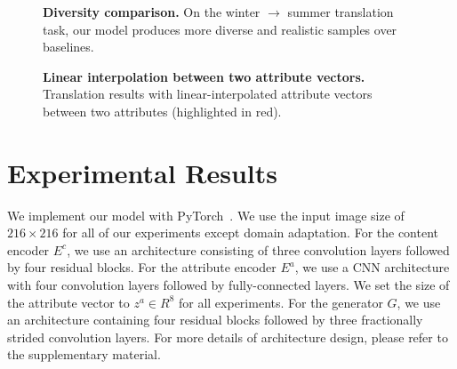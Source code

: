\documentclass[runningheads]{llncs}
\begin{document}
\begin{figure}[t]
	\caption{\textbf{Diversity comparison.} On the winter $\rightarrow$ summer translation task, our model produces more diverse and realistic samples over baselines.
	}
	\label{figure:diversity}
    \vspace{-4mm}
\end{figure}
\begin{figure}[t]
	\centering
	\caption{\textbf{Linear interpolation between two attribute vectors.}  Translation results with linear-interpolated attribute vectors between two attributes (highlighted in red).
	}
	\label{figure:interpolation}
    \vspace{\figmargin}
\end{figure}
\vspace{\secmargin}
\section{Experimental Results}
\label{sec:experiments}
\vspace{\secmargin}
\vspace{-1mm}
%
We implement our model with PyTorch~\cite{paszke2017pytorch}.
%
We use the input image size of $216 \times 216$ for all of our experiments except domain adaptation.
%
For the content encoder $E^c$, we use an architecture consisting of three convolution layers followed by four residual blocks.
% 
For the attribute encoder $E^a$, we use a CNN architecture with four convolution layers followed by fully-connected layers.
%
We set the size of the attribute vector to $z^a \in R^8$ for all experiments.
%
For the generator $G$, we use an architecture containing four residual blocks followed by three fractionally strided convolution layers.
%
For more details of architecture design, please refer to the supplementary material.
\end{document}
